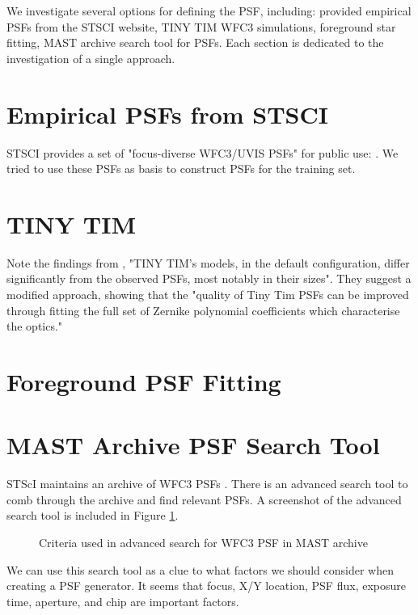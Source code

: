 \documentclass[twocolumn]{desc-tex/styles/lsstdescnote}
\begin{document}
\hfill \break
We investigate several options for defining the PSF, including: provided empirical PSFs from the STSCI website, TINY TIM WFC3 simulations, foreground star fitting, MAST archive search tool for PSFs. Each section is dedicated to the investigation of a single approach. 

\section{Empirical PSFs from STSCI}

STSCI provides a set of "focus-diverse WFC3/UVIS PSFs" for public use: \cite{stsci_psfs}. We tried to use these PSFs as basis to construct PSFs for the training set. 

\section{TINY TIM}

Note the findings from \cite{Gillis_2020}, "TINY TIM’s models, in the default configuration, differ significantly from the observed PSFs, most notably in their sizes". They suggest a modified approach, showing that the "quality of Tiny Tim PSFs can be improved through fitting the full set of Zernike polynomial coefficients which characterise the optics."

\section{Foreground PSF Fitting}

\section{MAST Archive PSF Search Tool}

STScI maintains an archive of WFC3 PSFs \citep{mast_tool}. There is an advanced search tool to comb through the archive and find relevant PSFs. A screenshot of the advanced search tool is included in Figure \ref{fig:mast_tool}.

\begin{figure}[hbt!]
  \centering
  \hfill
  \caption{Criteria used in advanced search for WFC3 PSF in MAST archive}
  \label{fig:mast_tool}
\end{figure}

We can use this search tool as a clue to what factors we should consider when creating a PSF generator. It seems that focus, X/Y location, PSF flux, exposure time, aperture, and chip are important factors. 


\end{document}
